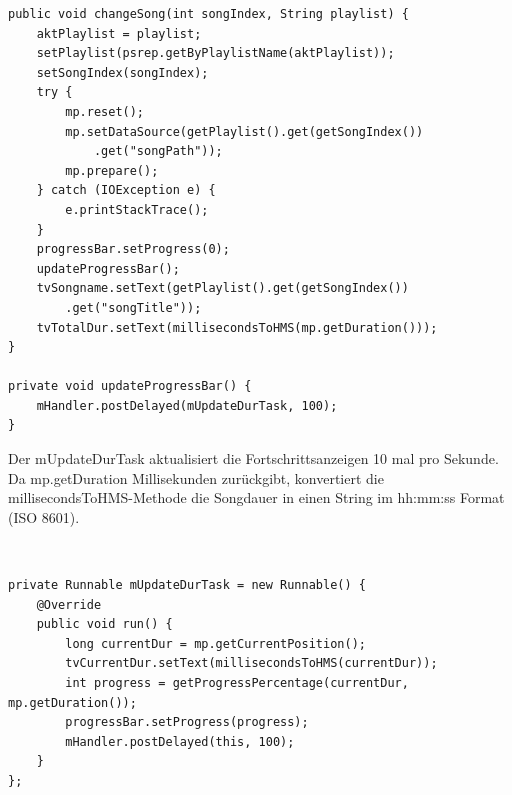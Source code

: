 \documentclass[FIPLY_base.tex]{subfiles}
\begin{document}
\newpage
\begin{lstlisting}[caption={Die changeSong-Methode},label=DescriptiveLabel]
public void changeSong(int songIndex, String playlist) {
    aktPlaylist = playlist;
    setPlaylist(psrep.getByPlaylistName(aktPlaylist));
    setSongIndex(songIndex);
    try {
        mp.reset();
        mp.setDataSource(getPlaylist().get(getSongIndex())
        	.get("songPath"));
        mp.prepare();
    } catch (IOException e) {
        e.printStackTrace();
    }
    progressBar.setProgress(0);
    updateProgressBar();
    tvSongname.setText(getPlaylist().get(getSongIndex())
    	.get("songTitle"));
    tvTotalDur.setText(millisecondsToHMS(mp.getDuration()));
}

private void updateProgressBar() {
    mHandler.postDelayed(mUpdateDurTask, 100);
}
\end{lstlisting}
Der mUpdateDurTask aktualisiert die Fortschrittsanzeigen 10 mal pro Sekunde.
Da mp.getDuration Millisekunden zurückgibt, konvertiert die \newline millisecondsToHMS-Methode die Songdauer in einen String im hh:mm:ss Format (ISO 8601).

\ \\
\begin{lstlisting}[caption={Das Runnable aktualisiert die Fortschrittsanzeigen des Musikplayers},label=DescriptiveLabel]
private Runnable mUpdateDurTask = new Runnable() {
    @Override
    public void run() {
        long currentDur = mp.getCurrentPosition();
        tvCurrentDur.setText(millisecondsToHMS(currentDur));
        int progress = getProgressPercentage(currentDur, mp.getDuration());
        progressBar.setProgress(progress);
        mHandler.postDelayed(this, 100);
    }
};
\end{lstlisting}
\end{document}
